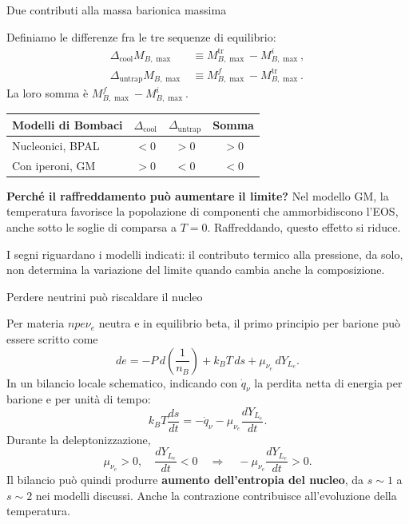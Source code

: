\begin{frame}[t,label=pns-completa-08]{Due contributi alla massa barionica massima}
\small\raggedright
Definiamo le differenze fra le tre sequenze di equilibrio:
\begin{align*}
 \Delta_{\mathrm{cool}}M_{B,\max}
   &\equiv M_{B,\max}^{\mathrm{tr}}-M_{B,\max}^{i},\\
 \Delta_{\mathrm{untrap}}M_{B,\max}
   &\equiv M_{B,\max}^{f}-M_{B,\max}^{\mathrm{tr}}.
\end{align*}
La loro somma \`e $M_{B,\max}^{f}-M_{B,\max}^{i}$.

\medskip
{\renewcommand{\arraystretch}{1.25}
\begin{tabular}{|p{}|c|c|c|}
\hline
\textbf{Modelli di Bombaci} & $\Delta_{\mathrm{cool}}$ & $\Delta_{\mathrm{untrap}}$ & \textbf{Somma} \\
\hline
Nucleonici, BPAL & $<0$ & $>0$ & $>0$ \\
\hline
Con iperoni, GM & $>0$ & $<0$ & $<0$ \\
\hline
\end{tabular}}

\medskip
\textbf{Perch\'e il raffreddamento pu\`o aumentare il limite?}
Nel modello GM, la temperatura favorisce la popolazione di
componenti che ammorbidiscono l'EOS, anche sotto le soglie
di comparsa a $T=0$. Raffreddando, questo effetto si riduce.

\medskip
I segni riguardano i modelli indicati: il contributo termico
alla pressione, da solo, non determina la variazione del limite
quando cambia anche la composizione.

\end{frame}

\begin{frame}[t,label=pns-completa-09]{Perdere neutrini pu\`o riscaldare il nucleo}
\small\raggedright
Per materia $npe\nu_e$ neutra e in equilibrio beta,
il primo principio per barione pu\`o essere scritto come
\[
 de=-P\,d\!\left(\frac{1}{n_B}\right)
 +k_B T\,ds+\mu_{\nu_e}\,dY_{L_e}.
\]
In un bilancio locale schematico, indicando con $\dot q_\nu$
la perdita netta di energia per barione e per unit\`a di tempo:
\[
 \boxed{k_B T\frac{ds}{dt}
 =-\dot q_\nu-\mu_{\nu_e}\frac{dY_{L_e}}{dt}}.
\]
Durante la deleptonizzazione,
\[
 \mu_{\nu_e}>0,\quad\frac{dY_{L_e}}{dt}<0
 \quad\Longrightarrow\quad
 -\mu_{\nu_e}\frac{dY_{L_e}}{dt}>0.
\]
Il bilancio pu\`o quindi produrre \textbf{aumento dell'entropia
del nucleo}, da $s\sim1$ a $s\sim2$ nei modelli discussi.
Anche la contrazione contribuisce all'evoluzione della temperatura.
\end{frame}

